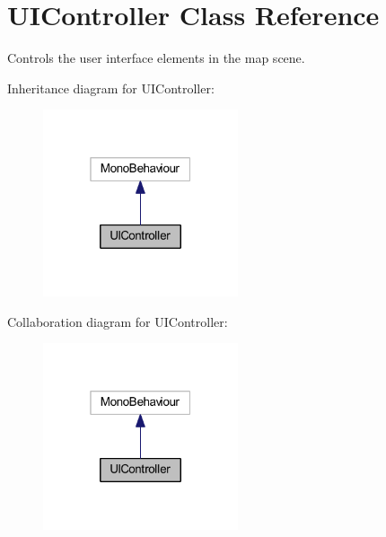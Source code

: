 \hypertarget{class_u_i_controller}{}\section{U\+I\+Controller Class Reference}
\label{class_u_i_controller}


Controls the user interface elements in the map scene.  




Inheritance diagram for U\+I\+Controller\+:\nopagebreak
\begin{figure}[H]
\begin{center}
\leavevmode
\includegraphics[width=163pt]{class_u_i_controller__inherit__graph}
\end{center}
\end{figure}


Collaboration diagram for U\+I\+Controller\+:\nopagebreak
\begin{figure}[H]
\begin{center}
\leavevmode
\includegraphics[width=163pt]{class_u_i_controller__coll__graph}
\end{center}
\end{figure}
